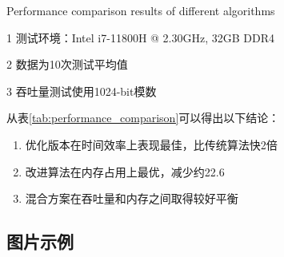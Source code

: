 \begin{table}[H] %
	\centering
	{Performance comparison results of different algorithms}
	\label{tab:performance_comparison}
	
	
	\begin{tablenotes}
		\small
		\item[1] 测试环境：Intel i7-11800H @ 2.30GHz, 32GB DDR4
		\item[2] 数据为10次测试平均值
		\item[3] 吞吐量测试使用1024-bit模数
	\end{tablenotes}
\end{table}

从表\ref{tab:performance_comparison}可以得出以下结论：
\begin{enumerate}
	\item 优化版本在时间效率上表现最佳，比传统算法快2倍
	\item 改进算法在内存占用上最优，减少约22.6%
	\item 混合方案在吞吐量和内存之间取得较好平衡
\end{enumerate}

\subsection{图片示例}


